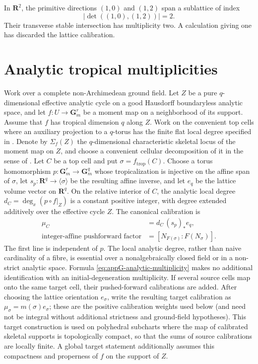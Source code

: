 \begin{example}
\label{ex:appG-index-test}
In \(\mathbf R^2\), the primitive directions \((1,0)\) and \((1,2)\)
span a sublattice of index
\[
                         |\det((1,0),(1,2))|=2.
\]
Their transverse stable intersection has multiplicity two.
A calculation giving one has discarded the lattice calibration.
\end{example}

\section{Analytic tropical multiplicities}
\label{sec:appG-analytic-multiplicity}

Work over a complete non-Archimedean ground field.
Let \(Z\) be a pure \(q\)-dimensional effective analytic cycle on a good Hausdorff
boundaryless analytic space, and let
\(f:U\to\mathbf G_m^r\) be a moment map on a neighborhood of its support.
Assume that \(f\) has tropical dimension \(q\) along \(Z\).  Work on the
convenient top cells where an auxiliary projection to a \(q\)-torus
has the finite flat local degree specified in \cite[\S14.3.2]{CLD25}.
Denote by \(\Sigma_f(Z)\) the
\(q\)-dimensional characteristic skeletal locus of the moment map on \(Z\),
and choose a convenient cellular decomposition of it in the sense of
\cite[\S14.3.2]{CLD25}.  Let \(C\) be a top cell and put
\(\sigma=f_{\mathrm{trop}}(C)\).
Choose a torus homomorphism \(p:\mathbf G_m^r\to\mathbf G_m^q\) whose
tropicalization is injective on the affine span of \(\sigma\), let
\(s_p:\mathbf R^q\to\langle\sigma\rangle\) be the resulting affine inverse,
and let \(e_q\) be the lattice volume vector on \(\mathbf R^q\).  On the
relative interior of \(C\), the analytic local degree
\(d_C=\deg_x(p\circ f|_Z)\) is a constant positive integer, with degree extended additively
over the effective cycle \(Z\).  The canonical calibration is
\[
\begin{aligned}
 \mu_C&=d_C\,(s_p)_*e_q,\\
 \text{integer-affine pushforward factor}
   &=[N_{F(\sigma)}:F(N_\sigma)].
\end{aligned}
\tag{G.24}\label{eq:appG-analytic-multiplicity}
\]
The first line is independent of \(p\).  The local analytic degree, rather
than naive cardinality of a fibre, is essential over a nonalgebraically
closed field or in a non-strict analytic space.  Formula
\eqref{eq:appG-analytic-multiplicity} makes no additional identification with
an initial-degeneration multiplicity.  If several source cells map onto the
same target cell, their pushed-forward calibrations are added.  After choosing
the lattice orientation \(e_\sigma\), write the resulting target calibration
as \(\mu_\sigma=m(\sigma)e_\sigma\); these are the positive calibration
weights used below (and need not be integral without additional strictness and
ground-field hypotheses).  This target construction is used on
polyhedral subcharts where the map of calibrated skeletal supports is
topologically compact, so that the sums of source calibrations are locally
finite.  A global target statement additionally assumes this compactness
and properness of \(f\) on the support of \(Z\).

